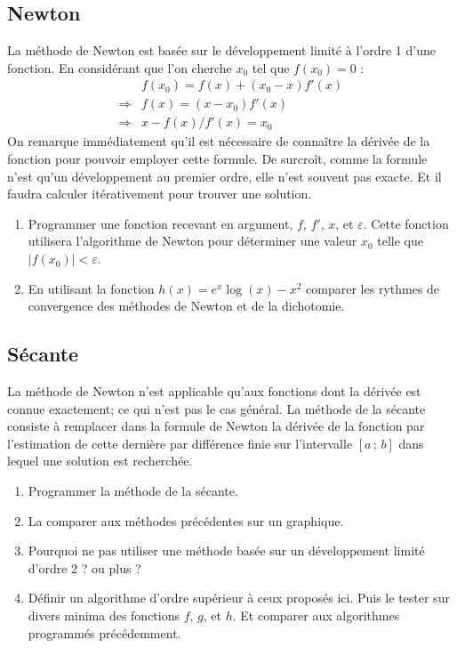 \subsection{Newton}
La méthode de Newton est basée sur le développement limité à l'ordre 1
d'une fonction. En considérant que l'on cherche $x_0$ tel que $f(x_0) = 0$ :
\begin{align}
& f(x_0) = f(x) + (x_0-x) f'(x) \\
\Rightarrow & f(x) = (x-x_0)f'(x) \\
\Rightarrow & x-f(x)/f'(x) = x_0
\end{align}
On remarque immédiatement qu'il est nécessaire de connaître la dérivée
de la fonction pour pouvoir employer cette formule. De surcroît,
comme la formule n'est qu'un développement au premier ordre, elle n'est souvent pas
exacte. Et il faudra calculer itérativement pour trouver une solution.
\begin{enumerate}
\item Programmer une fonction recevant en argument, $f$, $f'$, $x$, et $\varepsilon$. Cette fonction utilisera l'algorithme de Newton pour
déterminer une valeur $x_0$ telle que $|f(x_0)| < \varepsilon$.
\item En utilisant la fonction $h(x) = e^x\log(x)-x^2$ comparer les rythmes de convergence des méthodes
  de Newton et de la dichotomie.
\end{enumerate}


\subsection{Sécante}
La méthode de Newton n'est applicable qu'aux fonctions dont la dérivée
est connue exactement; ce qui n'est pas le cas général.
La méthode de la sécante consiste à remplacer dans la formule de Newton
la dérivée de la fonction par l'estimation de cette dernière par différence finie
sur l'intervalle $[a\,;\,b]$ dans lequel une solution est recherchée.
\begin{enumerate}
\item Programmer la méthode de la sécante.
\item La comparer aux méthodes précédentes sur un graphique.
\item Pourquoi ne pas utiliser une méthode basée sur un développement
limité d'ordre 2 ? ou plus ?
\item Définir un algorithme d'ordre supérieur à ceux proposés ici.
Puis le tester sur divers minima des fonctions $f$, $g$, et $h$. Et comparer
aux algorithmes programmés précédemment.
\end{enumerate}

